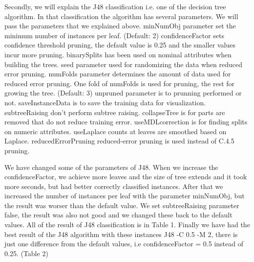 \documentclass[a4paper]{article}
\begin{document}
Secondly, we will explain the J48 classification i.e. one of the decision tree
algorithm. In that classification the algorithm has several parameters. We will
pass the parameters that we explained above. minNumObj parameter set the minimum
number of instances per leaf. (Default: 2) confidenceFactor sets confidence
threshold pruning, the default value is 0.25 and the smaller values incur more
pruning. binarySplits has been used on nominal attributes when building the
trees. seed parameter used for randomizing the data when reduced error pruning.
numFolds parameter determines the amount of data used for reduced error
pruning.  One fold of numFolds is used for pruning, the rest for growing the
tree. (Default: 3) unpruned parameter is to prunning performed or not.
saveInstanceData is to save the training data for visualization. subtreeRaising
don't perform subtree raising. collapseTree is for parts are removed that do
not reduce training error. useMDLcorrection is for finding splits on numeric
attributes. useLaplace counts at leaves are smoothed based on Laplace.
reducedErrorPruning reduced-error pruning is used instead of C.4.5 pruning. 

We have changed some of the parameters of J48. When we increase the
confidenceFactor, we achieve more leaves and the size of tree extends and it
took more seconds, but had better correctly classified instances. After that we
increased the number of instances per leaf with the parameter minNumObj, but the
result was worser than the default value. We set subtreeRaising parameter false,
the result was also not good and we changed these back to the default values. All of
the result of J48 classification is in Table 1. Finally we have had the best
result of the J48 algorithm with these instances J48 -C 0.5 -M 2, there is just
one difference from the default values, i.e confidenceFactor = 0.5 instead of
0.25. (Table 2) 
\end{document}
